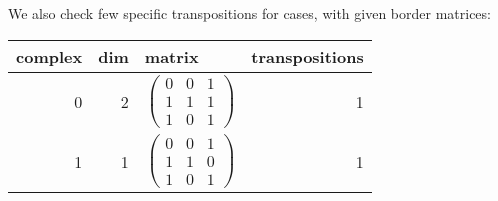 \documentclass{article}
\begin{document}
\par We also check few specific transpositions for cases, with given border matrices:
\begin{center}
\begin{tabular}{rrlr}
\toprule
complex & dim & matrix & transpositions \\
\midrule
0 & 2 & $\begin{pmatrix}0 & 0 & 1 \\1 & 1 & 1 \\1 & 0 & 1\end{pmatrix}$ & 1 \\
1 & 1 & $\begin{pmatrix}0 & 0 & 1 \\1 & 1 & 0 \\1 & 0 & 1\end{pmatrix}$ & 1 \\
\bottomrule
\end{tabular}

\end{center}
\end{document}
